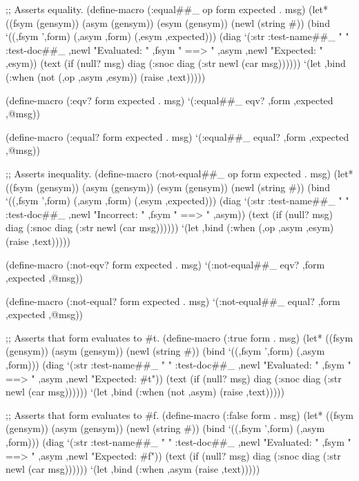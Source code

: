 ;; Asserts equality.
(define-macro (:equal##_ op form expected . msg)
  (let* ((fsym (gensym))
         (asym (gensym))
         (esym (gensym))
         (newl (string #\newline))
         (bind `((,fsym ',form)
                 (,asym ,form)
                 (,esym ,expected)))
         (diag `(:str :test-name##_ " " :test-doc##_ ,newl
                      "Evaluated: " ,fsym " ==> " ,asym ,newl
                      "Expected:  " ,esym))
         (text (if (null? msg) diag (:snoc diag (:str newl (car msg))))))
    `(let ,bind
       (:when (not (,op ,asym ,esym))
         (raise ,text)))))

(define-macro (:eqv? form expected . msg)
  `(:equal##_ eqv? ,form ,expected ,@msg))

(define-macro (:equal? form expected . msg)
  `(:equal##_ equal? ,form ,expected ,@msg))


;; Asserts inequality.
(define-macro (:not-equal##_ op form expected . msg)
  (let* ((fsym (gensym))
         (asym (gensym))
         (esym (gensym))
         (newl (string #\newline))
         (bind `((,fsym ',form)
                 (,asym ,form)
                 (,esym ,expected)))
         (diag `(:str :test-name##_ " " :test-doc##_ ,newl
                      "Incorrect: " ,fsym " ==> " ,asym))
         (text (if (null? msg) diag (:snoc diag (:str newl (car msg))))))
    `(let ,bind
       (:when (,op ,asym ,esym)
         (raise ,text)))))

(define-macro (:not-eqv? form expected . msg)
  `(:not-equal##_ eqv? ,form ,expected ,@msg))

(define-macro (:not-equal? form expected . msg)
  `(:not-equal##_ equal? ,form ,expected ,@msg))


;; Asserts that form evaluates to #t.
(define-macro (:true form . msg)
  (let* ((fsym (gensym))
         (asym (gensym))
         (newl (string #\newline))
         (bind `((,fsym ',form)
                 (,asym ,form)))
         (diag `(:str :test-name##_ " " :test-doc##_ ,newl
                      "Evaluated: " ,fsym " ==> " ,asym ,newl
                      "Expected:  #t"))
         (text (if (null? msg) diag (:snoc diag (:str newl (car msg))))))
    `(let ,bind
       (:when (not ,asym)
         (raise ,text)))))


;; Asserts that form evaluates to #f.
(define-macro (:false form . msg)
  (let* ((fsym (gensym))
         (asym (gensym))
         (newl (string #\newline))
         (bind `((,fsym ',form)
                 (,asym ,form)))
         (diag `(:str :test-name##_ " " :test-doc##_ ,newl
                      "Evaluated: " ,fsym " ==> " ,asym ,newl
                      "Expected:  #f"))
         (text (if (null? msg) diag (:snoc diag (:str newl (car msg))))))
    `(let ,bind
       (:when ,asym
         (raise ,text)))))


